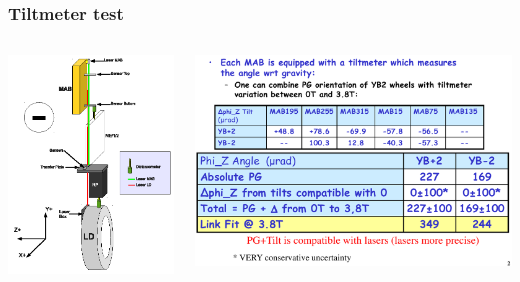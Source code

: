 \documentclass[compress]{beamer}
\begin{document}
\begin{frame}
\frametitle{Tiltmeter test}

\vspace{0.25 cm}
\begin{columns}
\includegraphics[width=\linewidth]{link_hardware_diagram2.png}

\includegraphics[width=\linewidth]{inclinometers.png}
\end{columns}


\end{frame}
\end{document}
